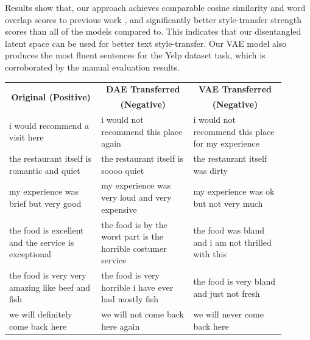 \documentclass[letterpaper]{article} %
\newcommand{\tabh}[1]{\multicolumn{1}{c|}{\textbf{#1}}}
\newcommand{\tabc}[2]{\multicolumn{1}{|c||}{\multirow{#1}{*}{\textbf{#2}}}}
\begin{document}
Results show that, our approach achieves comparable cosine similarity and word overlap scores to previous work \cite{shen2017style,zhao2018adversarially}, and significantly better style-transfer strength scores than all of the models compared to. This indicates that our disentangled latent space can be used for better text style-transfer.
Our VAE model also produces the most fluent sentences for the Yelp dataset task, which is corroborated by the manual evaluation results.


\begin{table}[ht]
	\centering
	\small
	\begin{tabular}{| p{0.3\linewidth} || p{0.3\linewidth} | p{0.3\linewidth} |}
		\hline
		\tabc{2}{Original (Positive)}                          & \tabh{DAE Transferred}                                         & \tabh{VAE Transferred}                                      \\
		                                                       & \tabh{(Negative)}                                              & \tabh{(Negative)}                                           \\
		\hline
		\hline
		i would recommend a visit here                         & i would not recommend this place again                         & i would not recommend this place for my experience          \\
		\hline
		the restaurant itself is romantic and quiet            & the restaurant itself is soooo quiet                           & the restaurant itself was dirty                             \\
		\hline
		my experience was brief but very good                  & my experience was very loud and very expensive                 & my experience was ok but not very much                      \\
		\hline
		the food is excellent and the service is exceptional   & the food is by the worst part is the horrible costumer service & the food was bland and i am not thrilled with this          \\
		\hline
		the food is very very amazing like beef and fish       & the food is very horrible i have ever had mostly fish          & the food is very bland and just not fresh                   \\
		\hline
		we will definitely come back here                      & we will not come back here again                               & we will never come back here                                \\

\end{tabular}
\end{table}
\end{document}
